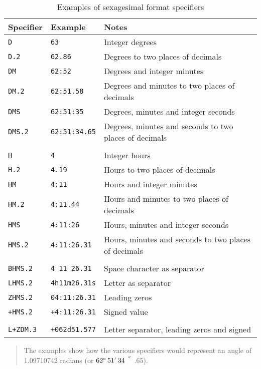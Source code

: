 \documentclass[twoside,11pt]{article}
\newcommand{\arcsec} {$\hspace{-0.05em}\raisebox{-0.5ex}
                     {$^{'\hspace{-0.1em}'}$}
                     \hspace{-0.7em}.\hspace{-0.05em}$}
\newcommand{\dms}[4] {$#1^{\circ}\,#2\raisebox{-0.5ex}{$^{'}$}\,#3\arcsec#4$}
\renewcommand{\_}{\texttt{\symbol{95}}}
\begin{document}
\begin{table}[htbp]

\begin{center}
\begin{tabular}{lll}
Specifier     & Example            & Notes          \\ \hline
{\tt D}       & {\tt 63}          & Integer degrees \\
{\tt D.2}     & {\tt 62.86}       & Degrees to two places of decimals \\
{\tt DM}      & {\tt 62:52}       & Degrees and integer minutes \\
{\tt DM.2}    & {\tt 62:51.58}    & Degrees and minutes to two places of decimals \\
{\tt DMS}     & {\tt 62:51:35}    & Degrees, minutes and integer seconds \\
{\tt DMS.2}   & {\tt 62:51:34.65} & Degrees, minutes and seconds to two places of decimals \\
              &                    & \\
{\tt H}       & {\tt 4}            & Integer hours \\
{\tt H.2}     & {\tt 4.19}         & Hours to two places of decimals \\ 
{\tt HM}      & {\tt 4:11}         & Hours and integer minutes \\
{\tt HM.2}    & {\tt 4:11.44}      & Hours and minutes to two places of decimals \\
{\tt HMS}     & {\tt 4:11:26}      & Hours, minutes and integer seconds \\
{\tt HMS.2}   & {\tt 4:11:26.31}   & Hours, minutes and seconds to two places of decimals \\
              &                    & \\
{\tt BHMS.2}  & {\tt 4 11 26.31}   & Space character as separator \\
{\tt LHMS.2}  & {\tt 4h11m26.31s}  & Letter as separator \\
{\tt ZHMS.2}  & {\tt 04:11:26.31}  & Leading zeros \\
{\tt +HMS.2}  & {\tt +4:11:26.31}  & Signed value \\
              &                    & \\
{\tt L+ZDM.3} & {\tt +062d51.577}  & Letter separator, leading zeros and signed \\
\end{tabular}

\begin{quote}
The examples show how the various specifiers would represent an angle of
1.09710742 radians (or \dms{62}{51}{34}{65}).
\end{quote}

\caption{\label{SEXAG_EXAM}Examples of sexagesimal format specifiers}
\end{center}

\end{table}
\end{document}

